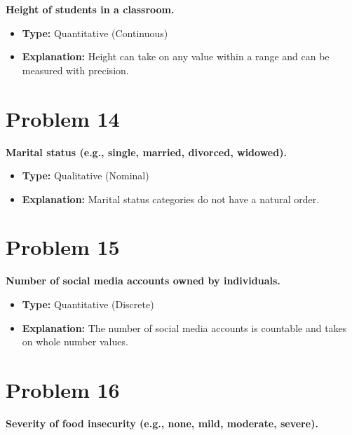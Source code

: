 \documentclass[
  letterpaper,
  DIV=11,
  numbers=noendperiod]{scrreprt}
\begin{document}

\textbf{Height of students in a classroom.}

\begin{itemize}
\item
  \textbf{Type:} Quantitative (Continuous)
\item
  \textbf{Explanation:} Height can take on any value within a range and
  can be measured with precision.
\end{itemize}

\section*{Problem 14}\label{problem-14-2}


\textbf{Marital status (e.g., single, married, divorced, widowed).}

\begin{itemize}
\item
  \textbf{Type:} Qualitative (Nominal)
\item
  \textbf{Explanation:} Marital status categories do not have a natural
  order.
\end{itemize}

\section*{Problem 15}\label{problem-15-2}


\textbf{Number of social media accounts owned by individuals.}

\begin{itemize}
\item
  \textbf{Type:} Quantitative (Discrete)
\item
  \textbf{Explanation:} The number of social media accounts is countable
  and takes on whole number values.
\end{itemize}

\section*{Problem 16}\label{problem-16-2}


\textbf{Severity of food insecurity (e.g., none, mild, moderate,
severe).}
\end{document}
